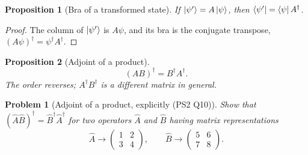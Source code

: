 \documentclass{article}
\newtheorem{problem}{Problem}
\newtheorem{proposition}{Proposition}
\begin{document}
\begin{proposition}[Bra of a transformed state]
    If $\ket{\psi'} = A\ket{\psi}$, then $\bra{\psi'} = \bra{\psi}A^\dagger$.
\end{proposition}
\begin{proof}
    The column of $\ket{\psi'}$ is $A\psi$, and its bra is the conjugate transpose, $(A\psi)^\dagger = \psi^\dagger A^\dagger$.
\end{proof}
\begin{proposition}[Adjoint of a product]
    \begin{equation}
        \left(AB\right)^\dagger = B^\dagger A^\dagger.
    \end{equation}
    The order reverses; $A^\dagger B^\dagger$ is a different matrix in general.
\end{proposition}
\begin{problem}[Adjoint of a product, explicitly (PS2 Q10)]
    Show that $(\hat{A}\hat{B})^\dagger = \hat{B}^\dagger\hat{A}^\dagger$ for two operators $\hat{A}$ and $\hat{B}$ having matrix representations
    \[\hat{A} \to \begin{pmatrix} 1 & 2 \\ 3 & 4 \end{pmatrix}, \qquad \hat{B} \to \begin{pmatrix} 5 & 6 \\ 7 & 8 \end{pmatrix}.\]
\end{problem}
\end{document}
